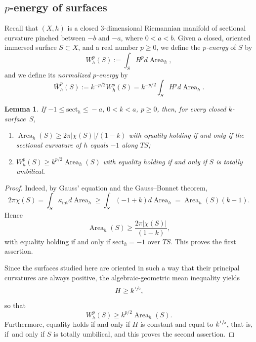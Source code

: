 \documentclass[11pt]{article}
\newcommand{\ksurface}{$k$\nobreakdash-surface\xspace}
\newcommand{\intt}{\mathrm{int}}
\theoremstyle{plain}
\newtheorem{lemma}[theorem]{Lemma}
\theoremstyle{definition}
\let\dans\subset
\newcommand{\sect}{\mathrm{sect}}
\DeclareMathOperator{\Area}{Area}
\begin{document}
\subsection{$p$-energy of surfaces} Recall that $(X,h)$ is a closed $3$\nobreakdash-dimensional Riemannian manifold of sectional curvature pinched between $-b$ and $-a$, where $0<a<b$. Given a closed, oriented immersed surface $S\dans X$, and a real number $p\geq 0$, we define the \emph{$p$-energy} of $S$ by
\begin{equation*}
W_h^{p}(S):=\int_S H^p d\Area_h,
\end{equation*}
and we define its \emph{normalized $p$-energy} by
\begin{equation*}
\overline{W}_h^{p}(S):=k^{-p/2}W_h^p(S)=k^{-p/2}\int_S H^p d\Area_h.
\end{equation*}

\begin{lemma}\label{lem_lower_bounds_energy}
If $-1\!\leq\!\sect_h\!\leq\! -a$, $0\!<\!k\!<\!a$, $p\!\geq\!0$, then, for every closed \ksurface~$S$,
\begin{enumerate}
\item $\Area_h(S)\geq 2\pi|\chi(S)|/(1-k)$ with equality holding if and only if the sectional curvature of $h$ equals $-1$ along $TS$;
\item $W_h^{p}(S)\geq k^{p/2}\Area_h(S)$ with equality holding if and only if $S$ is totally umbilical.
\end{enumerate}
\end{lemma}

\begin{proof}
Indeed, by Gauss' equation and the Gauss--Bonnet theorem,
\begin{equation*}
2 \pi \chi(S) = \int_{S} \kappa_{\intt}d\Area_h \geq \int_{S} (-1 + k)d\Area_h=\Area_h(S) (k-1).
\end{equation*}
Hence
\begin{equation*}
\Area_h(S) \geq \frac{2\pi\left|\chi(S)\right|}{(1-k)},
\end{equation*}
with equality holding if and only if $\sect_h=-1$ over $TS$. This proves the first assertion.

Since the surfaces studied here are oriented in such a way that their principal curvatures are always positive, the algebraic-geometric mean inequality yields
\begin{equation*}
H\geq k^{\sfrac{1}{2}},
\end{equation*}
so that
\begin{equation*}
W_h^p(S) \geq k^{p/2}\Area_h(S).
\end{equation*}
Furthermore, equality holds if and only if $H$ is constant and equal to $k^{\sfrac{1}{2}}$, that is, if~and only if $S$ is totally umbilical, and this proves the second assertion.
\end{proof}
\end{document}

